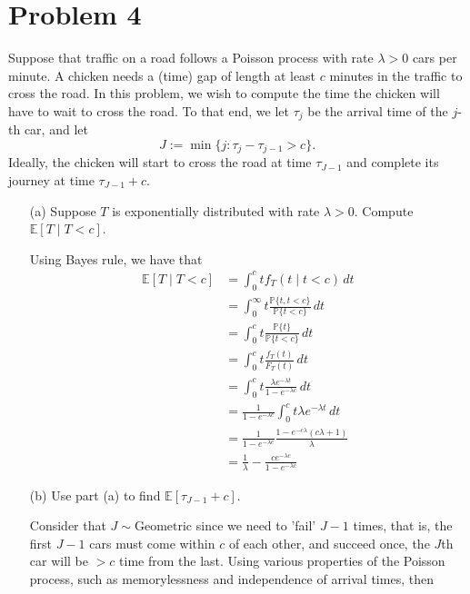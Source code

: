 \documentclass[11pt]{article}
\newcommand{\bbE}{\mathbb{E}}
\newcommand{\bbP}{\mathbb{P}}
\begin{document}
\newpage
\section*{Problem 4}
\begin{problem}
    Suppose that traffic on a road follows a Poisson process with rate \(\lambda > 0\) cars per minute. A chicken needs a (time) gap of length at least \(c\) minutes in the traffic to cross the road. In this problem, we wish to compute the time the chicken will have to wait to cross the road. To that end, we let \(\tau_j\) be the arrival time of the \(j\)-th car, and let 
\[
J := \min \{ j : \tau_j - \tau_{j-1} > c \}.
\]
Ideally, the chicken will start to cross the road at time \(\tau_{J-1}\) and complete its journey at time \(\tau_{J-1} + c\).

\begin{enumerate}
    \item[(a)] Suppose \(T\) is exponentially distributed with rate \(\lambda > 0\). Compute \(\mathbb{E}[T \mid T < c]\).
    \begin{solution}
        Using Bayes rule, we have that 
        \begin{align*}
            \bbE[T \mid T< c] &= \int_0^c t f_{T}(t \mid t< c)\, dt\\
             &=\int_0^\infty t \frac{\bbP\{t ,t< c\}}{\bbP\{t< c\}}\, dt\\
             &= \int_0^c t\frac{\bbP\{t\}}{\bbP\{t < c\}}\,dt\\
             &= \int_0^c t \frac{f_T(t)}{F_T(t)}\, dt\\
             &= \int_0^c t \frac{\lambda e^{-\lambda t}}{1- e^{-\lambda c}}\, dt\\
             &= \frac{1}{1- e^{-\lambda c}}\int_0^c t\lambda e^{-\lambda t}\, dt\\
             &= \frac{1}{1- e^{-\lambda c}} \frac{1 - e^{-c\lambda}(c\lambda + 1)}{\lambda}\\
             &= \frac{1}{\lambda} - \frac{ce^{-\lambda c}}{1- e^{-\lambda c}}
        \end{align*}
    \end{solution}
    \item[(b)] Use part (a) to find \(\mathbb{E}[\tau_{J-1} + c]\).
\begin{solution}
Consider that $J \sim \text{Geometric}$ since we need to 'fail' $J-1$ times, that is, the first $J-1$ cars must come within $c$ of each other, and succeed once, the $J$th car will be $>c$ time from the last. Using various properties of the Poisson process, such as memorylessness and independence of arrival times, then

\end{solution}
\end{enumerate}
\end{problem}
\end{document}

